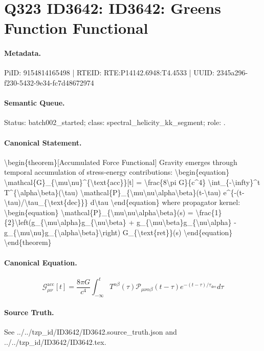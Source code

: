 \section*{Q323 ID3642: ID3642: Greens Function Functional}
\paragraph{Metadata.}
PiID: 9154814165498 | RTEID: RTE:P14142.6948:T4.4533 | UUID: 2345a296-f230-5432-9e34-fc7d48672974

\paragraph{Semantic Queue.}
Status: batch002\_started; class: spectral\_helicity\_kk\_segment; role: .

\paragraph{Canonical Statement.}
\textbackslash{}begin\{theorem\}[Accumulated Force Functional] Gravity emerges through temporal accumulation of stress-energy contributions: \textbackslash{}begin\{equation\} \textbackslash{}mathcal\{G\}\_\{\textbackslash{}mu\textbackslash{}nu\}\textasciicircum{}\{\textbackslash{}text\{acc\}\}[t] = \textbackslash{}frac\{8\textbackslash{}pi G\}\{c\textasciicircum{}4\} \textbackslash{}int\_\{-\textbackslash{}infty\}\textasciicircum{}t T\textasciicircum{}\{\textbackslash{}alpha\textbackslash{}beta\}(\textbackslash{}tau) \textbackslash{}mathcal\{P\}\_\{\textbackslash{}mu\textbackslash{}nu\textbackslash{}alpha\textbackslash{}beta\}(t-\textbackslash{}tau) e\textasciicircum{}\{-(t-\textbackslash{}tau)/\textbackslash{}tau\_\{\textbackslash{}text\{dec\}\}\} d\textbackslash{}tau \textbackslash{}end\{equation\} where propagator kernel: \textbackslash{}begin\{equation\} \textbackslash{}mathcal\{P\}\_\{\textbackslash{}mu\textbackslash{}nu\textbackslash{}alpha\textbackslash{}beta\}(s) = \textbackslash{}frac\{1\}\{2\}\textbackslash{}left(g\_\{\textbackslash{}mu\textbackslash{}alpha\}g\_\{\textbackslash{}nu\textbackslash{}beta\} + g\_\{\textbackslash{}mu\textbackslash{}beta\}g\_\{\textbackslash{}nu\textbackslash{}alpha\} - g\_\{\textbackslash{}mu\textbackslash{}nu\}g\_\{\textbackslash{}alpha\textbackslash{}beta\}\textbackslash{}right) G\_\{\textbackslash{}text\{ret\}\}(s) \textbackslash{}end\{equation\} \textbackslash{}end\{theorem\}

\paragraph{Canonical Equation.}
\[
\begin{equation} \mathcal{G}_{\mu\nu}^{\text{acc}}[t] = \frac{8\pi G}{c^4} \int_{-\infty}^t T^{\alpha\beta}(\tau) \mathcal{P}_{\mu\nu\alpha\beta}(t-\tau) e^{-(t-\tau)/\tau_{\text{dec}}} d\tau \end{equation}
\]

\paragraph{Source Truth.}
See ../../tzp\_id/ID3642/ID3642.source\_truth.json and ../../tzp\_id/ID3642/ID3642.tex.

